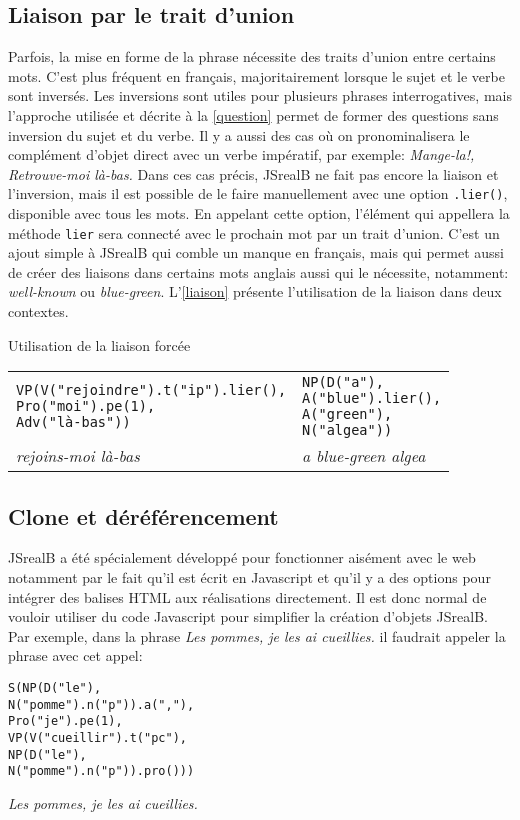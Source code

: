 \documentclass[11pt]{article} %
\newcommand{\system}[1]{\textsf{#1}}
\newcommand{\JSB}{\system{JSrealB}}
\newcommand{\real}[1]{\emph{#1}}
\begin{document}
\subsection{Liaison par le trait d'union}
Parfois, la mise en forme de
la phrase nécessite des traits d'union entre certains mots. C'est
plus fréquent en français, majoritairement lorsque le sujet et le
verbe sont inversés.  Les inversions sont utiles pour plusieurs phrases
interrogatives, mais l'approche utilisée et décrite à la \autoref{question}
 permet de former des questions sans inversion du sujet
et du verbe. Il y a aussi des cas où on pronominalisera le complément
d'objet direct avec un verbe impératif, par exemple: \emph{Mange-la!,
Retrouve-moi là-bas. }Dans ces cas précis, \JSB{} ne fait pas encore
la liaison et l'inversion, mais il est possible de le faire manuellement
avec une option \texttt{.lier()}, disponible avec tous les mots. En
appelant cette option, l'élément qui appellera la méthode \texttt{lier}
sera connecté avec le prochain mot par un trait d'union. C'est un
ajout simple à \JSB{} qui comble un manque en français, mais qui
permet aussi de créer des liaisons dans certains mots anglais aussi
qui le nécessite, notamment: \emph{well-known} ou \emph{blue-green}. L'\autoref{liaison}
présente l'utilisation de la liaison dans deux contextes.
\begin{example}
\centering
\caption{Utilisation de la liaison forcée}
\begin{tabular}{p{7cm} p{7cm}} 
\begin{alltt}
VP(V("rejoindre").t("ip").lier(),
   Pro("moi").pe(1),
   Adv("là-bas"))
\end{alltt} &
\begin{alltt}
NP(D("a"),
   A("blue").lier(),
   A("green"),
   N("algea"))
\end{alltt} \\
\real{rejoins-moi là-bas} & \real{a blue-green algea}\\
\end{tabular}
\label{liaison}
\end{example}


\subsection{Clone et déréférencement}
\label{clone}
\JSB{} a été spécialement développé pour fonctionner aisément avec
le web notamment par le fait qu'il est écrit en Javascript et qu'il
y a des options pour intégrer des balises HTML aux réalisations directement.
Il est donc normal de vouloir utiliser du code Javascript pour simplifier
la création d'objets \JSB{}. Par exemple, dans la phrase \emph{Les
pommes, je les ai cueillies. }il faudrait appeler la phrase avec cet
appel:
\begin{example}
\caption{}
\begin{alltt}
S(NP(D("le"),
     N("pomme").n("p")).a(","),
  Pro("je").pe(1),
  VP(V("cueillir").t("pc"),
     NP(D("le"),
        N("pomme").n("p")).pro()))
\end{alltt}
\real{Les pommes, je les ai cueillies.} 
\end{example}
\end{document}
